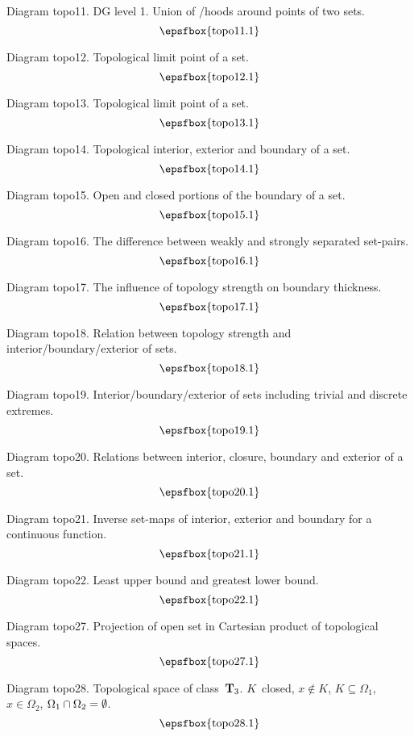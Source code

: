 Diagram topo11. DG level 1. Union of \neighbour/hoods around points of two sets.
$$
\centerline{\epsfbox{topo11.1}}
$$

\filleject

Diagram topo12. Topological limit point of a set.
$$
\centerline{\epsfbox{topo12.1}}
$$

Diagram topo13. Topological limit point of a set.
$$
\centerline{\epsfbox{topo13.1}}
$$

Diagram topo14. Topological interior, exterior and boundary of a set.
$$
\centerline{\epsfbox{topo14.1}}
$$

Diagram topo15. Open and closed portions of the boundary of a set.
$$
\centerline{\epsfbox{topo15.1}}
$$

\filleject

Diagram topo16. The difference between weakly and strongly separated set-pairs.
$$
\centerline{\epsfbox{topo16.1}}
$$

Diagram topo17. The influence of topology strength on boundary thickness.
$$
\centerline{\epsfbox{topo17.1}}
$$

Diagram topo18. Relation between topology strength and
interior/boundary/exterior of sets.
$$
\centerline{\epsfbox{topo18.1}}
$$

\filleject

Diagram topo19. Interior/boundary/exterior of sets including trivial and
discrete extremes.
$$
\centerline{\epsfbox{topo19.1}}
$$

Diagram topo20. Relations between interior, closure, boundary and exterior of a
set.
$$
\centerline{\epsfbox{topo20.1}}
$$

Diagram topo21. Inverse set-maps of interior, exterior and boundary for a
continuous function.
$$
\centerline{\epsfbox{topo21.1}}
$$

Diagram topo22. Least upper bound and greatest lower bound.
$$
\centerline{\epsfbox{topo22.1}}
$$

\filleject

Diagram topo27. Projection of open set in Cartesian product of topological
spaces.
$$
\centerline{\epsfbox{topo27.1}}
$$

Diagram topo28. Topological space of class~${\bf T}_3$. $K$~closed, $x\notin K$,
$K\subseteq\Omega_1$, $x\in\Omega_2$, $\Omega_1\mathbin{\cap}\Omega_2=\emptyset$.
$$
\centerline{\epsfbox{topo28.1}}
$$

